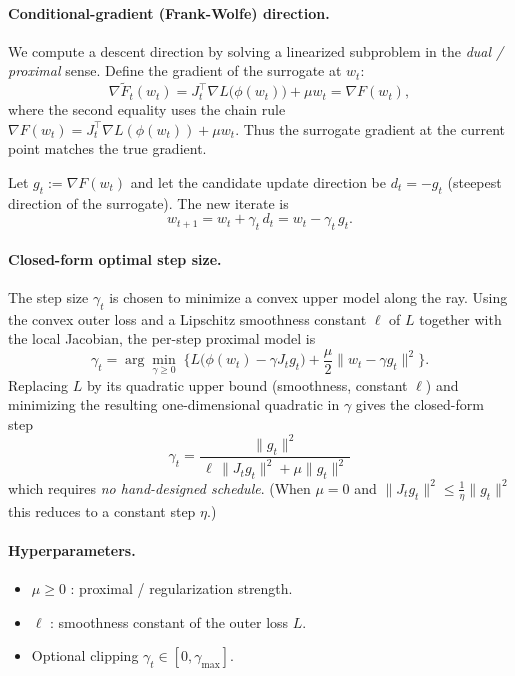 \documentclass[11pt]{article}
\begin{document}
\paragraph{Conditional-gradient (Frank-Wolfe) direction.}
We compute a descent direction by solving a linearized subproblem in the
\emph{dual / proximal} sense. Define the gradient of the surrogate at $w_t$:
\begin{equation}
\nabla \tilde{F}_t(w_t)
= J_t^\top \nabla L\big(\phi(w_t)\big) + \mu w_t
= \nabla F(w_t),
\label{eq:gradmatch}
\end{equation}
where the second equality uses the chain rule
$\nabla F(w_t) = J_t^\top \nabla L(\phi(w_t)) + \mu w_t$. Thus the surrogate
gradient at the current point matches the true gradient.

Let $g_t := \nabla F(w_t)$ and let the candidate update direction be
$d_t = -g_t$ (steepest direction of the surrogate). The new iterate is
\begin{equation}
w_{t+1} = w_t + \gamma_t \, d_t = w_t - \gamma_t \, g_t .
\label{eq:update}
\end{equation}

\paragraph{Closed-form optimal step size.}
The step size $\gamma_t$ is chosen to minimize a convex upper model along the
ray. Using the convex outer loss and a Lipschitz smoothness constant $\ell$ of
$L$ together with the local Jacobian, the per-step proximal model is
\begin{equation}
\gamma_t = \arg\min_{\gamma \ge 0}
\; \Big\{ L\big(\phi(w_t) - \gamma J_t g_t\big)
+ \frac{\mu}{2}\|w_t - \gamma g_t\|^2 \Big\}.
\label{eq:stepsub}
\end{equation}
Replacing $L$ by its quadratic upper bound (smoothness, constant $\ell$) and
minimizing the resulting one-dimensional quadratic in $\gamma$ gives the
closed-form step
\begin{equation}
\boxed{\;
\gamma_t = \frac{\|g_t\|^2}{\,\ell\,\|J_t g_t\|^2 + \mu \|g_t\|^2\,}
\;}
\label{eq:closedstep}
\end{equation}
which requires \emph{no hand-designed schedule}. (When $\mu=0$ and
$\|J_t g_t\|^2 \le \tfrac{1}{\eta}\|g_t\|^2$ this reduces to a constant
step $\eta$.)

\paragraph{Hyperparameters.}
\begin{itemize}
  \item $\mu \ge 0$ : proximal / regularization strength.
  \item $\ell$ : smoothness constant of the outer loss $L$.
  \item Optional clipping $\gamma_t \in [0,\gamma_{\max}]$.
\end{itemize}
\end{document}

